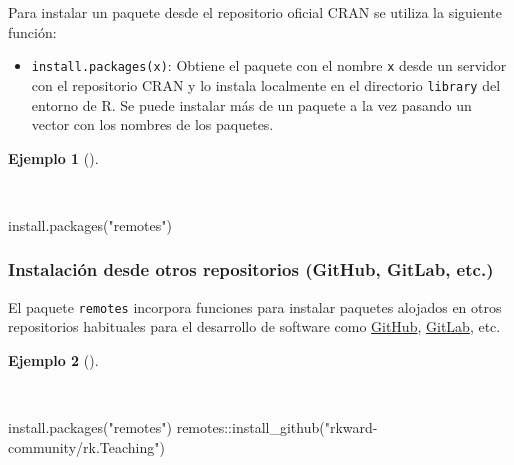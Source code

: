\documentclass[
  spanish,
  a4paper,
]{scrreport}
\newenvironment{Shaded}{\begin{snugshade}}{\end{snugshade}}
\newcommand{\FunctionTok}[1]{\textcolor[rgb]{0.28,0.35,0.67}{#1}}
\newcommand{\NormalTok}[1]{\textcolor[rgb]{0.00,0.23,0.31}{#1}}
\newcommand{\SpecialCharTok}[1]{\textcolor[rgb]{0.37,0.37,0.37}{#1}}
\newcommand{\StringTok}[1]{\textcolor[rgb]{0.13,0.47,0.30}{#1}}
\providecommand{\tightlist}{%
  \setlength{\itemsep}{0pt}\setlength{\parskip}{0pt}}
\theoremstyle{definition}
\theoremstyle{definition}
\newtheorem{example}{Ejemplo}[chapter]
\theoremstyle{remark}
\begin{document}
Para instalar un paquete desde el repositorio oficial CRAN se utiliza la
siguiente función:

\begin{itemize}
\tightlist
\item
  \texttt{install.packages(x)}: Obtiene el paquete con el nombre
  \texttt{x} desde un servidor con el repositorio CRAN y lo instala
  localmente en el directorio \texttt{library} del entorno de R. Se
  puede instalar más de un paquete a la vez pasando un vector con los
  nombres de los paquetes.
\end{itemize}

\begin{example}[]\protect\hypertarget{exm-instalacion-paquetes}{}\label{exm-instalacion-paquetes}

~

\begin{Shaded}
\begin{Highlighting}[]
\FunctionTok{install.packages}\NormalTok{(}\StringTok{"remotes"}\NormalTok{)}
\end{Highlighting}
\end{Shaded}

\end{example}

\subsubsection{Instalación desde otros repositorios (GitHub, GitLab,
etc.)}\label{instalaciuxf3n-desde-otros-repositorios-github-gitlab-etc.}

El paquete \texttt{remotes} incorpora funciones para instalar paquetes
alojados en otros repositorios habituales para el desarrollo de software
como \href{https://github.com/}{GitHub},
\href{httpsb://gitlab.com/}{GitLab}, etc.

\begin{example}[]\protect\hypertarget{exm-instalacion-paquetes-github}{}\label{exm-instalacion-paquetes-github}

~

\begin{Shaded}
\begin{Highlighting}[]
\FunctionTok{install.packages}\NormalTok{(}\StringTok{"remotes"}\NormalTok{)}
\NormalTok{remotes}\SpecialCharTok{::}\FunctionTok{install\_github}\NormalTok{(}\StringTok{"rkward{-}community/rk.Teaching"}\NormalTok{)}
\end{Highlighting}
\end{Shaded}

\end{example}
\end{document}
